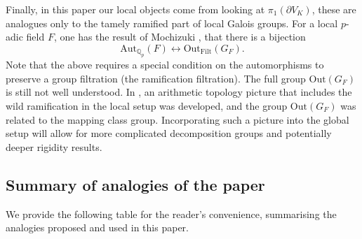 \documentclass{amsart}
\theoremstyle{plain}
\theoremstyle{definition}
\theoremstyle{plain}
\theoremstyle{plain}
\theoremstyle{plain}
\theoremstyle{remark}
\theoremstyle{remark}
\theoremstyle{plain}
\theoremstyle{definition}
\theoremstyle{plain}
\theoremstyle{plain}
\theoremstyle{plain}
\numberwithin{equation}{section}
\begin{document}
Finally, in this paper our local objects come from looking at $\pi_1(\partial V_K)$, these are analogues only to the tamely ramified part of local Galois groups. For a local $p$-adic field $F$, one has the result of Mochizuki \cite{mochizuki1997version}, that there is a bijection
\[\mathrm{Aut}_{\mathbb{Q}_{p}}(F)\longleftrightarrow \mathrm{Out}_{\mathrm{Filt}}(G_{F}).\]
Note that the above requires a special condition on the automorphisms to preserve a group filtration (the ramification filtration). The full group $\text{Out}(G_F)$ is still not well understood. In \cite{gropper2023surfaces}, an arithmetic topology picture that includes the wild ramification in the local setup was developed, and the group $\text{Out}(G_F)$ was related to the mapping class group. Incorporating such a picture into the global setup will allow for more complicated decomposition groups and potentially deeper rigidity results.


\subsection{Summary of analogies of the paper}

We provide the following table for the reader's convenience, summarising the analogies proposed and used in this paper.
\end{document}
